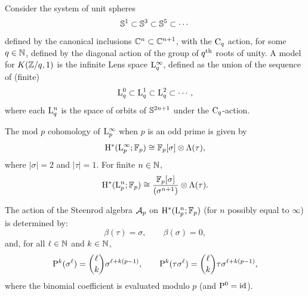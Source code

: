 \subsubsection{}\label{sss:cohomology_lens}

Consider the system of unit spheres
\[
\mathbb{S}^1 \subset \mathbb{S}^3 \subset \mathbb{S}^5 \subset \dotsb
\]
defined by the canonical inclusions \(\mathbb{C}^n \subset \mathbb{C}^{n+1}\), with the \(\mathrm{C}_q\) action, for some \(q \in \mathbb{N}\), defined by the diagonal action of the group of \(q^{\mathrm{th}}\) roots of unity.
A model for \(K(\mathbb{Z}/q,1)\) is the infinite Lens space \(\mathrm{L}^\infty_q\), defined as the union of the sequence of (finite) 
\[
\mathrm{L}^0_q \subset \mathrm{L}^1_q \subset \mathrm{L}^2_q \subset \dotsb,
\]
where each \(\mathrm{L}^n_q\) is the space of orbits of \(\mathbb{S}^{2n+1}\) under the \(\mathrm{C}_q\)-action.

The mod \(p\) cohomology of \(\mathrm{L}^\infty_p\) when \(p\) is an odd prime is given by
\[
\mathrm{H}^\ast(\mathrm{L}^\infty_p; {\mathbb{F}_p})
\cong
{\mathbb{F}_p}[\sigma] \otimes \Lambda(\tau),
\]
where \(|\sigma| = 2\) and \(|\tau| = 1\).
For finite \(n \in \mathbb{N}\),
\[
\mathrm{H}^\ast(\mathrm{L}^n_p; {\mathbb{F}_p})
\cong
\frac{{\mathbb{F}_p}[\sigma]}{(\sigma^{n+1})} \otimes \Lambda(\tau).
\]

The action of the Steenrod algebra \(\mathcal{A}_p\) on \(\mathrm{H}^\ast(\mathrm{L}^n_p; {\mathbb{F}_p})\) (for \(n\) possibly equal to \(\infty\)) is determined by:
\[
\beta(\tau) = \sigma,
\qquad
\beta(\sigma) = 0,
\]
and, for all \(\ell \in \mathbb{N}\) and \(k \in \mathbb{N}\),
\[
\mathrm{P}^k(\sigma^\ell) = \binom{\ell}{k}\sigma^{\ell+k(p-1)},
\qquad
\mathrm{P}^k(\tau\sigma^\ell) = \binom{\ell}{k}\tau\sigma^{\ell+k(p-1)},
\]
where the binomial coefficient is evaluated modulo \(p\) (and \(\mathrm{P}^0 = \mathrm{id}\)).
